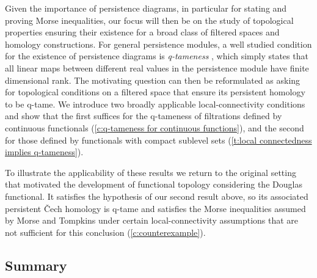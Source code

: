 Given the importance of persistence diagrams, in particular for stating and proving Morse inequalities, our focus will then be on the study of topological properties ensuring their existence for a broad class of filtered spaces and homology constructions.
For general persistence modules, a well studied condition for the existence of persistence diagrams is \emph{q-tameness} \cite{Chazal.2016a,Chazal.2016b}, which simply states that all linear maps between different real values in the persistence module have finite dimensional rank.
The motivating question can then be reformulated as asking for topological conditions on a filtered space that ensure its persistent homology to be q-tame.
We introduce two broadly applicable local-connectivity conditions and show that the first suffices for the \mbox{q-tameness} of filtrations defined by continuous functionals (\cref{c:q-tameness for continuous functions}), and the second for those defined by functionals with compact sublevel sets (\cref{t:local connectedness implies q-tameness}).

To illustrate the applicability of these results we return to the original setting that motivated the development of functional topology considering the Douglas functional.
It satisfies the hypothesis of our second result above, so its associated persistent \v{C}ech homology is q-tame and satisfies the Morse inequalities assumed by Morse and Tompkins under certain local-connectivity assumptions that are not sufficient for this conclusion (\cref{c:counterexample}).

\subsection*{Summary}


